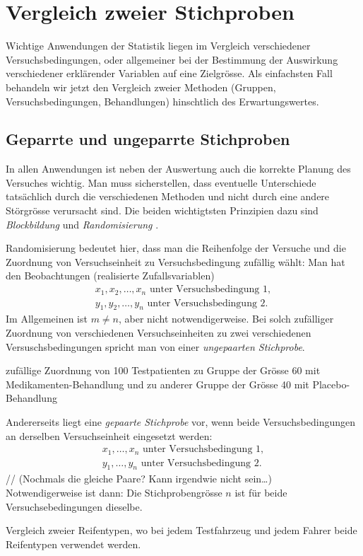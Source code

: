 \chapter{Vergleich zweier Stichproben}
\label{kap11}
Wichtige Anwendungen der Statistik liegen im Vergleich verschiedener Versuchsbedingungen, oder allgemeiner bei der Bestimmung der Auswirkung verschiedener erklärender Variablen auf eine Zielgrösse. Als einfachsten Fall behandeln wir jetzt den Vergleich zweier Methoden (Gruppen, Versuchsbedingungen, Behandlungen) hinschtlich des Erwartungswertes.
\section{Geparrte und ungeparrte Stichproben}
In allen Anwendungen ist neben der Auswertung auch die korrekte Planung des Versuches wichtig. Man muss sicherstellen, dass eventuelle Unterschiede tatsächlich durch die verschiedenen Methoden und nicht durch eine andere Störgrösse verursacht sind. Die beiden wichtigtsten Prinzipien dazu sind \emph{Blockbildung} und \emph{Randomisierung}
.

Randomisierung bedeutet hier, dass man die Reihenfolge der Versuche und die Zuordnung von Versuchseinheit zu Versuchsbedingung zufällig wählt: Man hat den Beobachtungen (realisierte Zufallsvariablen)
\begin{gather*}
	x_1,x_2,\ldots,x_n\text{ unter Versuchsbedingung 1},\\
	y_1,y_2,\ldots,y_n\text{ unter Versuchsbedingung 2}.
\end{gather*}
Im Allgemeinen ist $m\neq n$, aber nicht notwendigerweise. Bei solch zufälliger Zuordnung von verschiedenen Versuchseinheiten zu zwei verschiedenen Versuschsbedingungen spricht man von einer \emph{ungepaarten Stichprobe}.
\begin{bspl}
	zufällige Zuordnung von 100 Testpatienten zu Gruppe der Grösse 60 mit Medikamenten-Behandlung und zu anderer Gruppe der Grösse 40 mit Placebo-Behandlung
\end{bspl}
Andererseits liegt eine \emph{gepaarte Stichprobe} vor, wenn beide Versuchsbedingungen an derselben Versuchseinheit eingesetzt werden:
\begin{gather*}
	x_1,\ldots,x_n\text{ unter Versuchsbedingung 1},\\
	y_1,\ldots,y_n\text{ unter Versuchsbedingung 2}.
\end{gather*}
// (Nochmals die gleiche Paare? Kann irgendwie nicht sein\ldots) \\
Notwendigerweise ist dann: Die Stichprobengrösse $n$ ist für beide Versuchsebedingungen dieselbe.
\begin{bspl}
	Vergleich zweier Reifentypen, wo bei jedem Testfahrzeug und jedem Fahrer beide Reifentypen verwendet werden.
\end{bspl}

